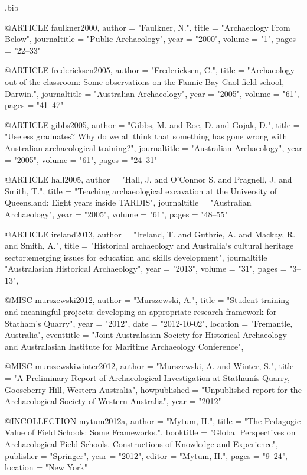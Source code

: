 \begin{filecontents}{\IJSRAidentifier.bib}
	
	@ARTICLE {faulkner2000,
		author  = "Faulkner, N.",
		title   = "Archaeology From Below",
		journaltitle = "Public Archaeology",
		year    = "2000",
		volume  = "1",
		pages   = "22--33"
	}
	
	
	@ARTICLE {fredericksen2005,
		author  = "Fredericksen, C.",
		title   = "Archaeology out of the classroom: Some observations on the Fannie Bay Gaol field school, Darwin.",
		journaltitle = "Australian Archaeology",
		year    = "2005",
		volume  = "61",
		pages   = "41--47"
	}
	
	
	@ARTICLE {gibbs2005,
		author  = "Gibbs, M. and Roe, D. and Gojak, D.",
		title   = "Useless graduates? Why do we all think that something has gone wrong with Australian archaeological training?",
		journaltitle = "Australian Archaeology",
		year    = "2005",
		volume  = "61",
		pages   = "24--31"
	}
	
	
	@ARTICLE {hall2005,
		author  = "Hall, J. and O'Connor S. and Pragnell, J. and Smith, T.",
		title   = "Teaching archaeological excavation at the University of Queensland: Eight years inside TARDIS",
		journaltitle = "Australian Archaeology",
		year    = "2005",
		volume  = "61",
		pages   = "48--55"
	}
	
	
	@ARTICLE {ireland2013,
		author  = "Ireland, T. and Guthrie, A. and Mackay, R. and Smith, A.",
		title   = "Historical archaeology and Australia`s cultural heritage sector:emerging issues for education and skills development",
		journaltitle = "Australasian Historical Archaeology",
		year    = "2013",
		volume  = "31",
		pages   = "3--13",
	}
	
	
	@MISC {murszewski2012,
		author = "Murszewski, A.",
		title  = "Student training and meaningful projects: developing an appropriate research framework for Statham's Quarry",
		year   = "2012",
		date   = "2012-10-02",
		location = "Fremantle, Australia",
		eventtitle = "Joint Australasian Society for Historical Archaeology and Australasian Institute for Maritime Archaeology Conference",
	}
	
	
	@MISC {murszewskiwinter2012,
		author       = "Murszewski, A. and Winter, S.",
		title        = "A Preliminary Report of Archaeological Investigation at Stathamís Quarry, Gooseberry Hill, Western Australia",
		howpublished = "Unpublished report for the Archaeological Society of Western Australia",
		year         = "2012"
	}
	
	
	@INCOLLECTION {mytum2012a,
		author    = "Mytum, H.",
		title     = "The Pedagogic Value of Field Schools: Some Frameworks.",
		booktitle = "Global Perspectives on Archaeological Field Schools. Constructions of Knowledge and Experience",
		publisher = "Springer",
		year      = "2012",
		editor    = "Mytum, H.",
		pages     = "9--24",
		location   = "New York"
	}
	

\end{filecontents}
